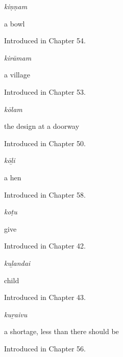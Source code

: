 \noindent\begin{minipage}[t]{\linewidth}
\raggedright
\textbf{}\enspace\emph{kiṇṇam}\par
\small a bowl\par
\footnotesize Introduced in Chapter 54.
\end{minipage}\par\medskip

\noindent\begin{minipage}[t]{\linewidth}
\raggedright
\textbf{}\enspace\emph{kirāmam}\par
\small a village\par
\footnotesize Introduced in Chapter 53.
\end{minipage}\par\medskip

\noindent\begin{minipage}[t]{\linewidth}
\raggedright
\textbf{}\enspace\emph{kōlam}\par
\small the design at a doorway\par
\footnotesize Introduced in Chapter 50.
\end{minipage}\par\medskip

\noindent\begin{minipage}[t]{\linewidth}
\raggedright
\textbf{}\enspace\emph{kōḻi}\par
\small a hen\par
\footnotesize Introduced in Chapter 58.
\end{minipage}\par\medskip

\noindent\begin{minipage}[t]{\linewidth}
\raggedright
\textbf{}\enspace\emph{koṭu}\par
\small give\par
\footnotesize Introduced in Chapter 42.
\end{minipage}\par\medskip

\noindent\begin{minipage}[t]{\linewidth}
\raggedright
\textbf{}\enspace\emph{kuḻandai}\par
\small child\par
\footnotesize Introduced in Chapter 43.
\end{minipage}\par\medskip

\noindent\begin{minipage}[t]{\linewidth}
\raggedright
\textbf{}\enspace\emph{kuṟaivu}\par
\small a shortage, less than there should be\par
\footnotesize Introduced in Chapter 56.
\end{minipage}\par\medskip

